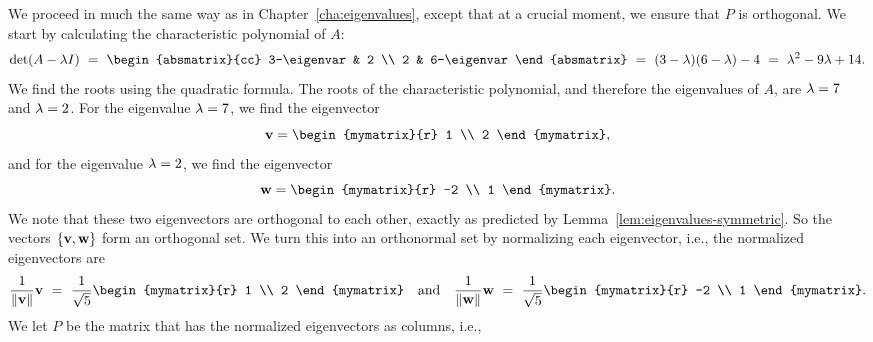 \begin{solution}
  We proceed in much the same way as in Chapter~\ref{cha:eigenvalues},
  except that at a crucial moment, we ensure that $P$ is orthogonal.
  We start by calculating the characteristic polynomial of $A$:
  \begin{equation*}
    \det(A-\eigenvar I)
    ~=~ \begin{absmatrix}{cc}
      3-\eigenvar & 2 \\
      2 & 6-\eigenvar
    \end{absmatrix}
    ~=~ (3-\eigenvar)(6-\eigenvar) - 4
    ~=~ \eigenvar^2 - 9\eigenvar + 14.
  \end{equation*}
  We find the roots using the quadratic formula. The roots of the
  characteristic polynomial, and therefore the eigenvalues of $A$, are
  $\lambda=7$ and $\lambda=2$. For the eigenvalue $\lambda=7$,
  we find the eigenvector
  \begin{equation*}
    \vect{v} = \begin{mymatrix}{r} 1 \\ 2 \end{mymatrix},
  \end{equation*}
  and for the eigenvalue $\lambda=2$, we find the eigenvector
  \begin{equation*}
    \vect{w} = \begin{mymatrix}{r} -2 \\ 1 \end{mymatrix}.
  \end{equation*}
  We note that these two eigenvectors are orthogonal to each other,
  exactly as predicted by Lemma~\ref{lem:eigenvalues-symmetric}. So
  the vectors $\set{\vect{v},\vect{w}}$ form an orthogonal set. We
  turn this into an orthonormal set by normalizing each eigenvector,
  i.e., the normalized eigenvectors are
  \begin{equation*}
    \frac{1}{\norm{\vect{v}}}\vect{v}
    ~=~ \frac{1}{\sqrt{5}} \begin{mymatrix}{r} 1 \\ 2 \end{mymatrix}
    \quad\mbox{and}\quad
    \frac{1}{\norm{\vect{w}}}\vect{w}
    ~=~ \frac{1}{\sqrt{5}} \begin{mymatrix}{r} -2 \\ 1 \end{mymatrix}.
  \end{equation*}
  We let $P$ be the matrix that has the normalized eigenvectors as
  columns, i.e.,
  \begin{equation*}

\end{equation*}
\end{solution}
